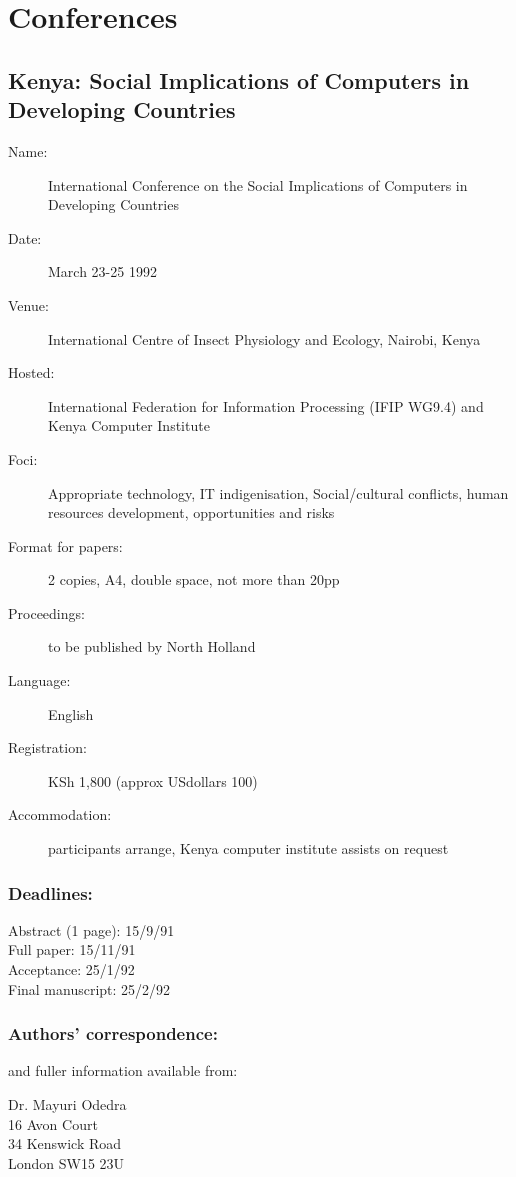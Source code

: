 \section{Conferences}
\subsection{Kenya: Social Implications of Computers in Developing Countries}
\begin{description}
\item[Name:]International Conference on the Social Implications of
Computers in Developing Countries 
\item[Date:] March 23-25 1992
\item[Venue:]International Centre of Insect Physiology and Ecology,
Nairobi, Kenya 
\item[Hosted:] International Federation for Information Processing
(IFIP WG9.4) and Kenya Computer Institute 
\item[Foci:] Appropriate technology, IT indigenisation,
Social/cultural conflicts, human resources development, opportunities
and risks 
\item[Format for papers:] 2 copies, A4, double space, not more than 20pp
\item[Proceedings:] to be published by North Holland
\item[Language:] English
\item[Registration:] KSh 1,800 (approx USdollars 100)
\item[Accommodation:] participants arrange, Kenya computer institute
assists on request
\end{description}
\subsubsection*{Deadlines:}
Abstract (1 page):	15/9/91\\
Full paper:		15/11/91\\
Acceptance:		25/1/92\\
Final manuscript:	25/2/92\\
\subsubsection*{Authors' correspondence:}
and fuller information available from:

		Dr. Mayuri Odedra\\
		16 Avon Court\\
		34 Kenswick Road\\
		London SW15 23U\\

